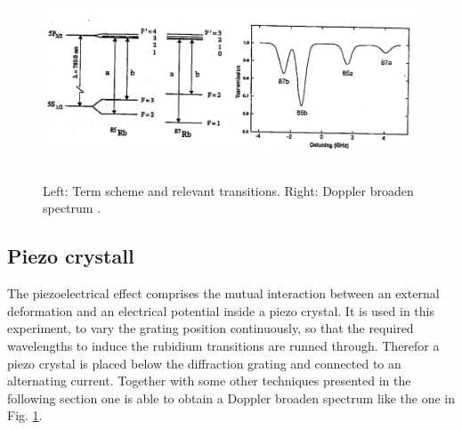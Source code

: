 \begin{figure}
  \centering
  \includegraphics[height=5.8cm]{Ordnername/dopplerandterm.png}
  \caption{Left: Term scheme and relevant transitions. Right: Doppler broaden spectrum \cite{manual}.}
  \label{fig:dopplerandterm}
\end{figure}

\subsection{Piezo crystall}

The piezoelectrical effect comprises the mutual interaction between an external deformation and an
electrical potential inside a piezo crystal. It is used in this experiment, to vary the grating
position continuously, so that the required wavelengths to induce the rubidium transitions are runned through.
Therefor a piezo crystal is placed below the diffraction grating and connected to an alternating current.
Together with some other techniques presented in the following section one is able to obtain a
Doppler broaden spectrum like the one in Fig. \ref{fig:dopplerandterm}.

